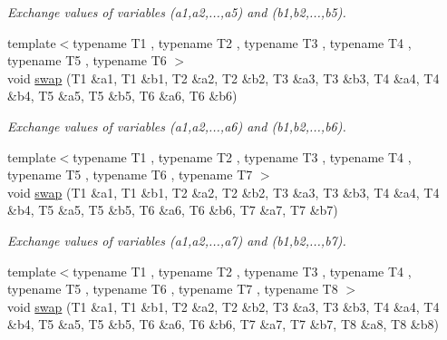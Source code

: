 \begin{DoxyCompactItemize}
\begin{DoxyCompactList}\small\item\em Exchange values of variables ({\ttfamily a1},{\ttfamily a2},...,{\ttfamily a5}) and ({\ttfamily b1},{\ttfamily b2},...,{\ttfamily b5}). \item\end{DoxyCompactList}\item 
\hypertarget{namespacecimg__library_1_1cimg_abf3d1cd948fdbc06ba7e9b83a7169d33}{
{\footnotesize template$<$typename T1 , typename T2 , typename T3 , typename T4 , typename T5 , typename T6 $>$ }\\void \hyperlink{namespacecimg__library_1_1cimg_abf3d1cd948fdbc06ba7e9b83a7169d33}{swap} (T1 \&a1, T1 \&b1, T2 \&a2, T2 \&b2, T3 \&a3, T3 \&b3, T4 \&a4, T4 \&b4, T5 \&a5, T5 \&b5, T6 \&a6, T6 \&b6)}
\label{namespacecimg__library_1_1cimg_abf3d1cd948fdbc06ba7e9b83a7169d33}

\begin{DoxyCompactList}\small\item\em Exchange values of variables ({\ttfamily a1},{\ttfamily a2},...,{\ttfamily a6}) and ({\ttfamily b1},{\ttfamily b2},...,{\ttfamily b6}). \item\end{DoxyCompactList}\item 
\hypertarget{namespacecimg__library_1_1cimg_a40c508097e570855c68bc944249ecf59}{
{\footnotesize template$<$typename T1 , typename T2 , typename T3 , typename T4 , typename T5 , typename T6 , typename T7 $>$ }\\void \hyperlink{namespacecimg__library_1_1cimg_a40c508097e570855c68bc944249ecf59}{swap} (T1 \&a1, T1 \&b1, T2 \&a2, T2 \&b2, T3 \&a3, T3 \&b3, T4 \&a4, T4 \&b4, T5 \&a5, T5 \&b5, T6 \&a6, T6 \&b6, T7 \&a7, T7 \&b7)}
\label{namespacecimg__library_1_1cimg_a40c508097e570855c68bc944249ecf59}

\begin{DoxyCompactList}\small\item\em Exchange values of variables ({\ttfamily a1},{\ttfamily a2},...,{\ttfamily a7}) and ({\ttfamily b1},{\ttfamily b2},...,{\ttfamily b7}). \item\end{DoxyCompactList}\item 
\hypertarget{namespacecimg__library_1_1cimg_aad6384858c4ccd23b249c370ccb2ed1d}{
{\footnotesize template$<$typename T1 , typename T2 , typename T3 , typename T4 , typename T5 , typename T6 , typename T7 , typename T8 $>$ }\\void \hyperlink{namespacecimg__library_1_1cimg_aad6384858c4ccd23b249c370ccb2ed1d}{swap} (T1 \&a1, T1 \&b1, T2 \&a2, T2 \&b2, T3 \&a3, T3 \&b3, T4 \&a4, T4 \&b4, T5 \&a5, T5 \&b5, T6 \&a6, T6 \&b6, T7 \&a7, T7 \&b7, T8 \&a8, T8 \&b8)}
\label{namespacecimg__library_1_1cimg_aad6384858c4ccd23b249c370ccb2ed1d}


\end{DoxyCompactItemize}
